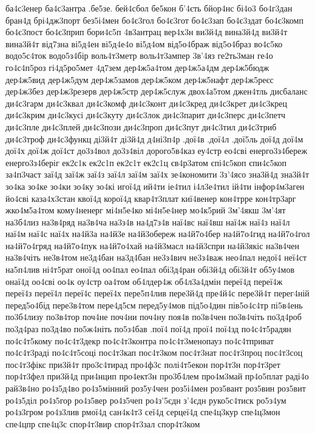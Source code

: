 {ба4с3енер
ба4с3антра
.бе5зе.
бей4сбол
бе5кон
б'4єть
бйор4нс
бі4о3
бо4г3дан
бран4д
брі4дж3порт
без5і4мен
бо4є3гол
бо4є3гот
бо4є3зап
бо4є3здат
бо4є3комп
бо4є3пост
бо4є3прип
бори4с5п
4в3антрац
вер4х3н
ви3й4д
вина3й4д
ви3й4т
вина3й4т
від7зна
ві5д4ен
ві5д4е4о
ві5д4ом
від5о4браж
від5о4браз
во4с5ко
водо5с4ток
водо5з4бір
воль4т3метр
воль4т3ампер
3в'4яз
ге2ть3ман
ге4о
го4с4п5роз
гі4д5ро5мет
4д7зем
дер4ж5а4том
дер4ж5а4дм
дер4ж5бюдж
дер4ж5вид
дер4ж5дум
дер4ж5замов
дер4ж5ком
дер4ж5нафт
дер4ж5реєс
дер4ж3без
дер4ж3резерв
дер4ж5стр
дер4ж5служ
двох4а5том
джен4тль
дисбаланс
ди4с3гарм
ди4с3квал
ди4с3комф
ди4с3конт
ди4с3кред
ди4с3крет
ди4с3крец
ди4с3крим
ди4с3кусі
ди4с3куту
ди4с3лок
ди4с3парит
ди4с3перс
ди4с3петч
ди4с3пле
ди4с3плей
ди4с3пози
ди4с3проп
ди4с3пут
ди4с3тил
ди4с3триб
ди4с3троф
ди4с3функц
ді3й4т
ді3й4д
д4ні3п4р
.дої4в
.дої4л
.дої5ль
дої4д
дої4м
дої4х
дої4ж
дої4ст
до3з4вол
до3з4віл
дорого5в4каз
еу4стр
ео4сві
енерго3з4береж
енерго3з4беріг
ек2с1к
ек2с1п
ек2с1т
ек2с1ц
єв4р3атом
єпі4с5коп
єпи4с5коп
за4п3част
заї4д
заї4ж
заї4з
заї4л
заї4м
заї4х
зе4кономити
3з'4ясо
зна3й4д
зна3й4т
зо4ка
зо4ке
зо4ки
зо4ку
зо4кі
игої4д
ий4ти
іе4тил
і4л3е4тил
ій4ти
інфор4м3аген
йо4сві
каза4х3стан
квої4д
корої4д
квар4т3плат
киї4венер
кон4трре
кон4тр3арг
жко4м5а4том
кому4ненерг
мі4н5е4ко
мі4н5е4нер
мо4к5рий
3м'4якш
3м'4ят
на3б4лиз
на3в4ряд
на3в4ча
на3з4в
на4д7з4в
наї4вс
наї4вш
наї4ж
наї4з
наї4л
наї4м
наї4с
наї4х
на4й3а
на4й3е
на4й3обереж
на4й7о4бер
на4й7о4гид
на4й7о4гол
на4й7о4гряд
на4й7о4пук
на4й7о4хай
на4й3масл
на4й3спри
на4й3якіс
на3в4чен
на3в4чіть
не3в4том
не3д4бан
на3д4бан
не3з4вич
не3з4важ
нео4пал
недої4
неї4ст
на5п4лив
ні4т5рат
оної4д
оо4пал
ео4пал
обі3д4ран
обі3й4д
обі3й4т
об5у4мов
онаї4д
оо4сві
оо4к
оу4стр 
оа4том
об4лдер4ж
об4л3а4дмін
переї4д
переї4ж
переї4з
переї4л
переї4с
переї4х
пере5п4лив
пере3й4д
пре4й4с
пере3й4т
перег4ній
перед5о4бід
пере3в4том
пере4д5см
перед5у4мов
під5о4дин
пів5о4с4тр
пі5в4ень
по3б4лизу
по3в4тор
поч4не
поч4ни
поч4ну
поя4в
по3в4чен
по3в4чіть
по3д4роб
по3д4раз
по3д4во
по5ж4ніть
по5з4бав
.пої4
пої4д
прої4
пої4зд
по4с4т5радян
по4с4т5кому
по4с4т3декр
по4с4т3контра
по4с4т3менопауз
по4с4тприват
по4с4т3раді
по4с4т5соці
пос4т3кап
пос4т3ком
пос4т3нат
пос4т3проц
пос4т3соц
пос4т3фікс
при3й4т
про3с4тирад
про4ф3с
полі4т5екон
пор4т3н
пор4т3рет
пор4т3фел
при3й4д
при4нцип
про4ект3н
про3б4лем
про4м3май
пр4о5плат
раді4о
рай3в4но
ро4з5д4во
ро4з5мінний
роз5у4чен
роз5і4мен
роз5вант
роз5вин
роз5вит
ро4з5діл
ро4з5гор
ро4з5вер
ро4з5чеп
ро4з'5єдн
з'4єдн
руко5с4тиск
ро5з4ум
ро4з3гром
ро4з3лив
рмої4д
сан4к4т3
сеї4д
серцеї4д
спе4ц3кур
спе4ц3мон
спе4цпр
спе4ц3с
спор4т3вир
спор4т3зал
спор4т3ком
}
